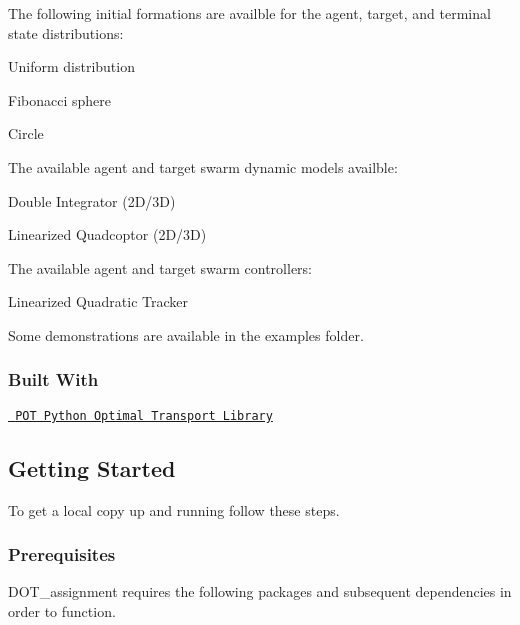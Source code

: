 The following initial formations are availble for the agent, target, and terminal state distributions\+:
\begin{DoxyItemize}
\item Uniform distribution
\item Fibonacci sphere
\item Circle
\end{DoxyItemize}

The available agent and target swarm dynamic models availble\+:
\begin{DoxyItemize}
\item Double Integrator (2D/3D)
\item Linearized Quadcoptor (2D/3D)
\end{DoxyItemize}

The available agent and target swarm controllers\+:
\begin{DoxyItemize}
\item Linearized Quadratic Tracker
\end{DoxyItemize}

Some demonstrations are available in the examples folder.

\subsubsection*{Built With}


\begin{DoxyItemize}
\item \href{https://github.com/rflamary/POT}{\texttt{ P\+OT Python Optimal Transport Library}}
\end{DoxyItemize}

\subsection*{Getting Started}

To get a local copy up and running follow these steps.

\subsubsection*{Prerequisites}

D\+O\+T\+\_\+assignment requires the following packages and subsequent dependencies in order to function.


